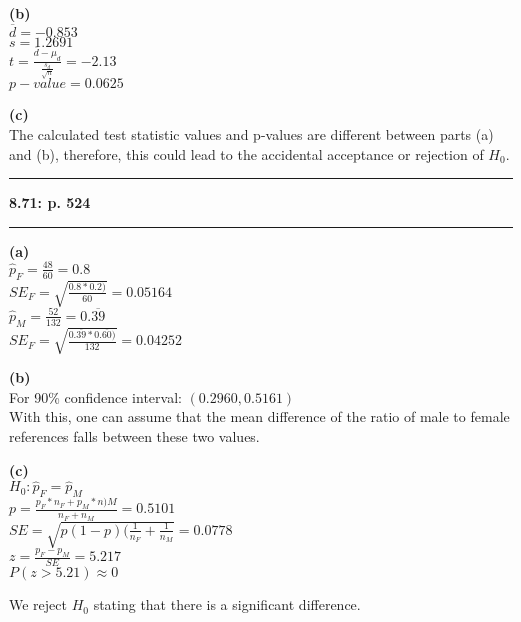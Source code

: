\documentclass[11pt]{article}
\newcommand\question[2]{\vspace{.25in}\hrule\textbf{#1: #2}\vspace{.5em}\hrule\vspace{.10in}}
\renewcommand\part[1]{\vspace{.10in}\textbf{(#1)}}
\begin{document}
\part{b}\\
	$\overline{d}=-0.853$\\
	$s = 1.2691 $\\
	$t = \frac{ \overline{d} - \mu_{d} }{ \frac{ s_{d} }{\sqrt{n}} } = -2.13$\\
	$p-value = 0.0625$
	
\part{c}\\
	The calculated test statistic values and p-values are different between parts (a) and (b), therefore, this could lead to the accidental acceptance or rejection of $H_{0}$.
	

\question{8.71}{p. 524}

\part{a}\\
	$\hat{p}_{F} = \frac{48}{60} = 0.8$\\
	$SE_{F} = \sqrt{ \frac{ 0.8*0.2) }{ 60 } } = 0.05164$\\
	$\hat{p}_{M} = \frac{52}{132} = 0.\overline{39}$\\
	$SE_{F} = \sqrt{ \frac{ 0.\overline{39}*0.\overline{60}) }{ 132 } } = 0.04252$
	
\part{b}\\
	For 90\% confidence interval: $(0.2960, 0.5161)$\\
	With this, one can assume that the mean difference of the ratio of male to female references falls between these two values.
	
\part{c}\\
	$H_{0} : \hat{p}_{F} = \hat{p}_{M}$\\
	$p = \frac{p_{F}*n_{F} + p_{M} * n){M}}{n_{F} + n_{M}} = 0.5101$\\
	$SE = \sqrt{ p(1-p)(\frac{1}{n_{F}} + \frac{1}{n_{M}} } = 0.0778$\\
	$z = \frac{ p_{F} - p_{M} }{SE} = 5.217$\\
	$P(z > 5.21) \approx 0$
	
	We reject $H_{0}$ stating that there is a significant difference.
\end{document}
